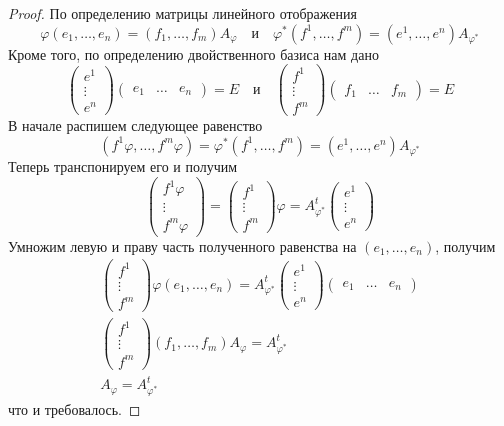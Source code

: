 \begin{proof}
По определению матрицы линейного отображения
\[
\varphi(e_1,\ldots,e_n) = (f_1,\ldots,f_m)A_{\varphi}\quad\text{и}\quad
\varphi^*(f^1,\ldots,f^m) = (e^1,\ldots,e^n)A_{\varphi^*}
\]
Кроме того, по определению двойственного базиса нам дано
\[
\begin{pmatrix}
{e^1}\\{\vdots}\\{e^n}
\end{pmatrix}
\begin{pmatrix}
{e_1}&{\ldots}&{e_n}
\end{pmatrix}
=E\quad\text{и}\quad
\begin{pmatrix}
{f^1}\\{\vdots}\\{f^m}
\end{pmatrix}
\begin{pmatrix}
{f_1}&{\ldots}&{f_m}
\end{pmatrix}
=E
\]
В начале распишем следующее равенство
\[
(f^1\varphi,\ldots,f^m\varphi)=\varphi^*(f^1,\ldots,f^m) = (e^1,\ldots,e^n)A_{\varphi^*}
\]
Теперь транспонируем его и получим
\[
\begin{pmatrix}
{f^1 \varphi}\\{\vdots}\\{f^m\varphi}
\end{pmatrix}
=
\begin{pmatrix}
{f^1}\\{\vdots}\\{f^m}
\end{pmatrix} \varphi
=
A_{\varphi^*}^t
\begin{pmatrix}
{e^1}\\{\vdots}\\{e^n}
\end{pmatrix}
\]
Умножим левую и праву часть полученного равенства на $(e_1,\ldots,e_n)$, получим
\begin{gather*}
\begin{pmatrix}
{f^1}\\{\vdots}\\{f^m}
\end{pmatrix} 
\varphi (e_1,\ldots,e_n)
=
A_{\varphi^*}^t
\begin{pmatrix}
{e^1}\\{\vdots}\\{e^n}
\end{pmatrix}
\begin{pmatrix}
{e_1}&{\ldots}&{e_n}
\end{pmatrix}\\
\begin{pmatrix}
{f^1}\\{\vdots}\\{f^m}
\end{pmatrix} 
(f_1,\ldots,f_m)A_{\varphi}
=
A_{\varphi^*}^t\\
A_{\varphi} = A_{\varphi^*}^t
\end{gather*}
что и требовалось.


\end{proof}
